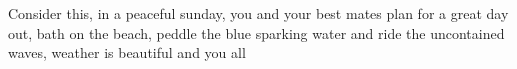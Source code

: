 Consider this, in a peaceful sunday, you and your best mates plan for a great day out, bath on the beach, peddle the blue sparking water and ride the uncontained waves, weather is beautiful and you all 